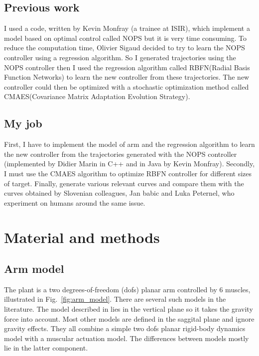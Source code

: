 \documentclass[pdftex,a4paper,11pt]{report}
\begin{document}
\section{Previous work}
I used a code, written by Kevin Monfray (a trainee at ISIR), which implement a model based on optimal control called NOPS but it is very time consuming.
To reduce the computation time, Olivier Sigaud decided to try to learn the NOPS controller using a regression algorithm.
So I generated trajectories using the NOPS controller then I used the regression algorithm called RBFN(Radial Basis Function Networks) to learn the new controller from these trajectories.
The new controller could then be optimized with a stochastic optimization method called CMAES(Covariance Matrix Adaptation Evolution Strategy).

\section{My job}
First, I have to implement the model of arm and the regression algorithm to learn the new controller from the trajectories generated with the NOPS controller (implemented by Didier Marin in C++ and in Java by Kevin Monfray).
Secondly, I must use the CMAES algorithm to optimize RBFN controller for different sizes of target.
Finally, generate various relevant curves and compare them with the curves obtained by Slovenian colleagues, Jan babic and Luka Peternel, who experiment on humans around the same issue.

\chapter{Material and methods}

\section{Arm model}
\label{sec_ArmModel}

The plant is a two degrees-of-freedom (dofs) planar arm controlled by 6 muscles, illustrated in Fig.~\ref{fig:arm_model}.
There are several such models in the literature. The model described in \cite{Kambara2009} lies in the vertical
plane so it takes the gravity force into account. Most other models are defined in the saggital plane and
ignore gravity effects. They all combine a simple two dofs planar rigid-body dynamics model with a 
muscular actuation model. The differences between models mostly lie in the latter component.
\end{document}
